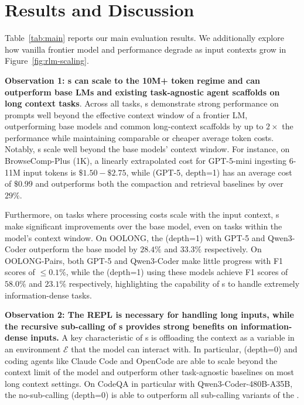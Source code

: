 \section{Results and Discussion} \label{sec4.3-results}
Table~\ref{tab:main} reports our main evaluation results. We additionally explore how vanilla frontier model and \RLM{} performance degrade as input contexts grow in Figure~\ref{fig:rlm-scaling}.







\textbf{Observation 1: \RLM{}s can scale to the 10M+ token regime and can outperform base LMs and existing task-agnostic agent scaffolds on long context tasks}. Across all tasks, \RLM{}s demonstrate strong performance on prompts well beyond the effective context window of a frontier LM, outperforming base models and common long-context scaffolds by up to $2\times$ the performance while maintaining comparable or cheaper average token costs. Notably, \RLM{}s scale well beyond the base models' context window. For instance, on BrowseComp-Plus (1K), a linearly extrapolated cost for GPT-5-mini ingesting 6-11M input tokens is $\$1.50 - \$2.75$, while \RLM(GPT-5, depth=1) has an average cost of $\$0.99$ and outperforms both the compaction and retrieval baselines by over $29\%$. 

Furthermore, on tasks where processing costs scale with the input context, \RLM{}s make significant improvements over the base model, even on tasks within the model's context window. On OOLONG, the \RLM{}(depth=1) with GPT-5 and Qwen3-Coder outperform the base model by $28.4\%$ and $33.3\%$ respectively. On OOLONG-Pairs, both GPT-5 and Qwen3-Coder make little progress with F1 scores of $\leq0.1\%$, while the \RLM{}(depth=1) using these models achieve F1 scores of $58.0\%$ and $23.1\%$ respectively, highlighting the capability of \RLM{}s to handle extremely information-dense tasks.


\textbf{Observation 2: The REPL is necessary for handling long inputs, while the recursive sub-calling of \RLM{}s provides strong benefits on information-dense inputs.} A key characteristic of \RLM{}s is offloading the context as a variable in an environment $\mathcal{E}$ that the model can interact with. In particular, \RLM{}(depth=0) and coding agents like Claude Code and OpenCode are able to scale beyond the context limit of the model and outperform other task-agnostic baselines on most long context settings. On CodeQA in particular with Qwen3-Coder-480B-A35B, the no-sub-calling \RLM(depth=0) is able to outperform all sub-calling variants of the \RLM.

